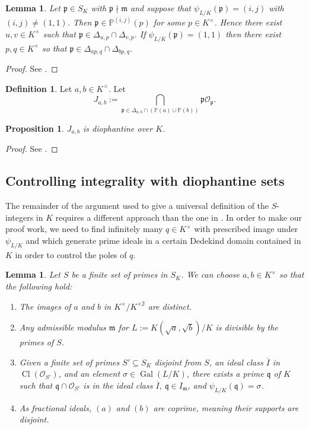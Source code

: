 \documentclass[12pt,reqno]{amsart}
\newcommand{\qq}{\mathfrak{q}}
\newcommand{\mm}{\mathfrak{m}}
\newcommand{\OO}{\mathcal{O}}
\newcommand{\pp}{\mathfrak{p}}
\newcommand{\PP}{\mathbb{P}}
\DeclareMathOperator{\Gal}{Gal}
\DeclareMathOperator{\Cl}{Cl}
\newtheorem{prop}[thm]{Proposition}
\newtheorem{lem}[thm]{Lemma}
\theoremstyle{definition}
\newtheorem{defn}[thm]{Definition}
\begin{document}
\begin{lem}
  Let $\pp\in S_K$ with $\pp\nmid \mm$ and suppose that
  $\psi_{L/K}(\pp)=(i,j)$ with $(i,j)\not=(1,1)$. Then
  $\pp\in \PP^{(i,j)}(p)$ for some $p\in K^{\times}$. Hence there
  exist $u,v\in K^{\times}$ such that
  $\pp\in \Delta_{u,p}\cap \Delta_{v,p}$. If $\psi_{L/K}(\pp)=(1,1)$
  then there exist $p,q\in K^{\times}$ so that
  $\pp\in \Delta_{ap,q}\cap \Delta_{bp,q}$.
\end{lem}
\begin{proof}
See \cite[Lemmas 3.11, 3.12]{Park}.
\end{proof}

\begin{defn}\label{Jabdef}
Let $a,b\in K^{\times}$. Let 
\[
J_{a,b} := \bigcap_{\pp\in \Delta_{a,b}\cap(\PP(a)\cup \PP(b))} \pp\OO_{\pp}.
\]
\end{defn}

\begin{prop}\label{Jabdio}
$J_{a,b}$ is diophantine over  $K$.
\end{prop}
\begin{proof}
See \cite[Lemmas 3.14, 3.15, 3.17]{Park}.
\end{proof}

\subsection{Controlling integrality with diophantine sets}\label{integralatsigma}

The remainder of the argument used to give a universal definition of the $S$-integers in $K$ requires a different approach than the one in \cite{Park}. In order to make our proof work, we need to find infinitely many $q\in K^{\times}$ with prescribed image under $\psi_{L/K}$ and which generate prime ideals in a certain Dedekind domain contained in $K$ in order to control the poles of $q$. 
\begin{lem}\label{3.19}
Let $S$ be a finite set of primes in $S_K$. We can choose $a,b\in K^{\times}$ so that the following hold: 
\begin{enumerate}
\item The images of $a$ and $b$ in $K^{\times}/K^{\times2}$ are distinct.
\item Any admissible modulus  $\mm$ for $L:=K(\sqrt{a},\sqrt{b})/K$ is divisible by the primes of $S$. 
\item Given a finite set of primes $S'\subseteq S_K$ disjoint from $S$, an ideal class $\overline{I}$ in $\Cl(\OO_{S'})$, and an element $\sigma \in \Gal(L/K)$, there exists a prime $\qq$ of $K$ such that $\qq\cap\OO_{S'}$ is in the ideal class $\overline{I}$, $\qq\in I_{\mm}$, and $\psi_{L/K}(\qq)=\sigma$. 
\item As fractional ideals, $(a)$ and $(b)$ are coprime, meaning their supports are disjoint.


\end{enumerate}
\end{lem}
\end{document}
